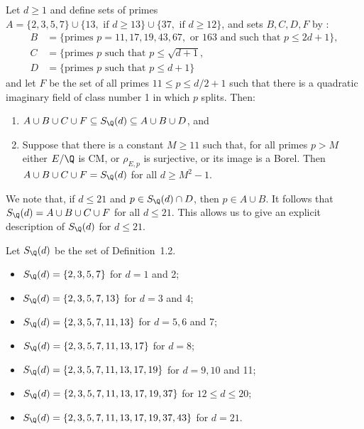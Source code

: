 \begin{thm} %
Let $d \geq 1$ and define sets of primes $A= \{ 2,3,5,7 \} \cup \{13, \text{ if } d \geq 13\} \cup \{37, \text{ if } d \geq 12 \}$, and sets $B, C, D, F$ by :
	\[
	\begin{aligned}
	B&= \{ \text{primes } p= 11, 17, 19, 43, 67, \text{ or } 163 \text{ and such that } p \leq 2d + 1 \}, \\
	C&= \{ \text{primes } p \text{ such that } p \leq \sqrt{d + 1}, \\
	D&= \{ \text{primes } p \text{ such that } p \leq d + 1 \}
	\end{aligned}
	\]
and let $F$ be the set of all primes $11 \leq p \leq d/2 + 1$ such that there is a quadratic imaginary field of class number 1 in which $p$ splits. Then:
	\begin{enumerate}[(1)]
	\item $A \cup B \cup C \cup F \subseteq S_\Q(d) \subseteq A \cup B \cup D$, and
	\item Suppose that there is a constant $M \geq 11$ such that, for all primes $p > M$ either $E/\Q$ is CM, or $\rho_{E,p}$ is surjective, or its image is a Borel. Then $A \cup B \cup C \cup F= S_\Q(d)$ for all $d \geq M^2 - 1$.
	\end{enumerate}
\end{thm}

We note that, if $d \leq 21$ and $p \in S_\Q(d) \cap D$, then $p \in A \cup B$. It follows that $S_\Q(d)= A \cup B \cup C \cup F$ for all $d \leq 21$. This allows us to give an explicit description of $S_\Q(d)$ for $d \leq 21$. 


\begin{cor} %
Let $S_\Q(d)$ be the set of Definition~1.2. 
	\begin{itemize}
	\item $S_\Q(d)= \{ 2,3,5,7 \}$ for $d= 1$ and 2;
	\item $S_\Q(d)= \{ 2,3,5,7,13 \}$ for $d= 3$ and 4; 
	\item $S_\Q(d)= \{ 2,3,5,7,11,13 \}$ for $d= 5,6$ and 7;
	\item $S_\Q(d)= \{ 2,3,5,7,11,13,17 \}$ for $d= 8$;
	\item $S_\Q(d)= \{ 2,3,5,7,11,13,17,19 \}$ for $d= 9,10$ and 11;
	\item $S_\Q(d)= \{ 2,3,5,7,11,13,17,19,37 \}$ for $12 \leq d \leq 20$;
	\item $S_\Q(d)= \{ 2,3,5,7,11,13,17,19,37,43 \}$ for $d= 21$.
	\end{itemize}
\end{cor}



